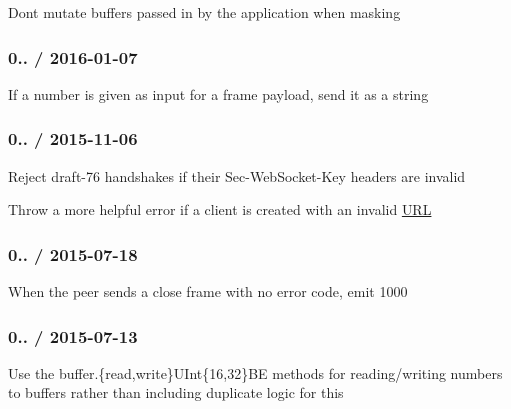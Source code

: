 
\begin{DoxyItemize}
\item Don\textquotesingle{}t mutate buffers passed in by the application when masking
\end{DoxyItemize}

\subsubsection*{0.. / 2016-\/01-\/07}


\begin{DoxyItemize}
\item If a number is given as input for a frame payload, send it as a string
\end{DoxyItemize}

\subsubsection*{0.. / 2015-\/11-\/06}


\begin{DoxyItemize}
\item Reject draft-\/76 handshakes if their Sec-\/\+Web\+Socket-\/\+Key headers are invalid
\item Throw a more helpful error if a client is created with an invalid \mbox{\hyperlink{namespace_u_r_l}{U\+RL}}
\end{DoxyItemize}

\subsubsection*{0.. / 2015-\/07-\/18}


\begin{DoxyItemize}
\item When the peer sends a close frame with no error code, emit 1000
\end{DoxyItemize}

\subsubsection*{0.. / 2015-\/07-\/13}


\begin{DoxyItemize}
\item Use the {\ttfamily buffer.\{read,write\}U\+Int\{16,32\}BE} methods for reading/writing numbers to buffers rather than including duplicate logic for this
\end{DoxyItemize}

